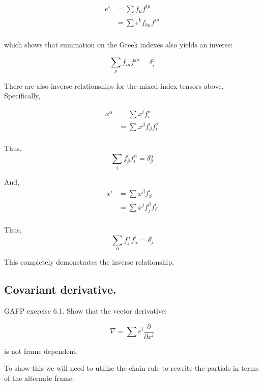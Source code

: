 \documentclass{article}      %
\begin{document}
\begin{align*}
e^i
&= \sum f_{\mu} f^{i \mu}  \\
&= \sum e^k f_{k\mu} f^{i \mu} \\
\end{align*}

which shows that summation on the Greek indexes also yields an inverse:

\begin{equation}
\sum_{\mu} f_{i\mu} f^{j \mu} = \delta_{i}^j
\end{equation}

There are also inverse relationships for the mixed index tensors above.  Specifically, 

\begin{align*}
x^{\alpha} 
&= \sum x^i f_i^{\alpha} \\
&= \sum x^{\beta} f_{\beta}^i f_i^{\alpha} \\
\end{align*}

Thus,
\begin{equation}
\sum_i f_{\beta}^i f_i^{\alpha} = \delta_{\beta}^{\alpha}
\end{equation}

And,
\begin{align*}
x^{i} 
&= \sum x^{\beta} f_{\beta}^i \\
&= \sum x^{j} f_j^{\beta} f_{\beta}^i \\
\end{align*}

Thus,
\begin{equation}
\sum_{\alpha} f_j^{\alpha} f_{\alpha}^i = \delta_j^i
\end{equation}

This completely demonstrates the inverse relationship.

\subsection{ Covariant derivative. }

GAFP exercise 6.1.  Show that the vector derivative:

\begin{equation}
\nabla = \sum e^i \frac{\partial}{\partial x^i}
\end{equation}

is not frame dependent.

To show this we will need to utilize the chain rule to rewrite the partials in terms of the alternate frame:
\end{document}
